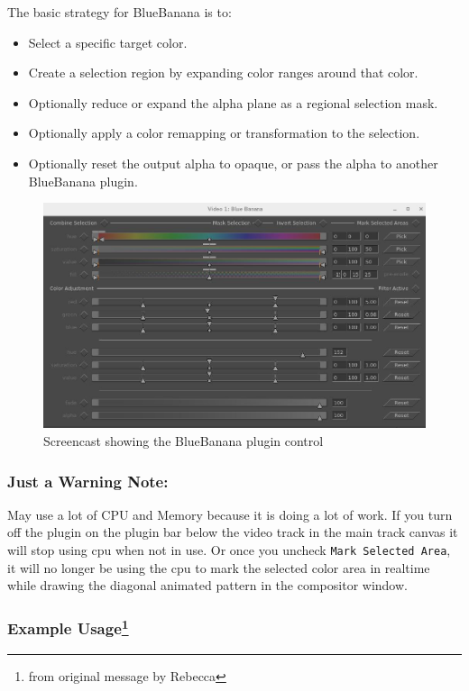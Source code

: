 The basic strategy for BlueBanana is to:

\begin{itemize}
    \item Select a specific target color.
    \item Create a selection region by expanding color ranges around that color.
    \item Optionally reduce or expand the alpha plane as a regional selection mask.
    \item Optionally apply a color remapping or transformation to the selection.
    \item Optionally reset the output alpha to opaque, or pass the alpha to another BlueBanana plugin.
\end{itemize}

\begin{figure}[htpb]
    \centering
    \includegraphics[width=0.8\linewidth]{images/bluebanana.png}
    \caption{Screencast showing the BlueBanana plugin control}
    \label{fig:bluebanana}
\end{figure}

\subsubsection*{Just a Warning Note:}
\label{ssub:warning_note}
May use a lot of CPU and Memory because it is doing a lot of work. If you turn off the plugin on the plugin bar below the video track in the main track canvas it will stop using cpu when not in use. Or once you uncheck \texttt{Mark Selected Area}, it will no longer be using the cpu to mark the selected color area in realtime while drawing the diagonal animated pattern in the compositor window.

\subsubsection{Example Usage\protect\footnote{from original message by Rebecca}}
\label{sssec:example_usage}

